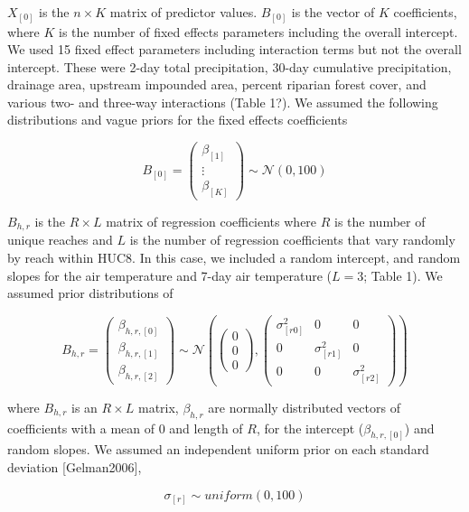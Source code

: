 \documentclass[]{article}
\begin{document}
\(X_{[0]}\) is the \(n \times K\) matrix of predictor values.
\(B_{[0]}\) is the vector of \(K\) coefficients, where \(K\) is the
number of fixed effects parameters including the overall intercept. We
used 15 fixed effect parameters including interaction terms but not the
overall intercept. These were 2-day total precipitation, 30-day
cumulative precipitation, drainage area, upstream impounded area,
percent riparian forest cover, and various two- and three-way
interactions (Table 1?). We assumed the following distributions and
vague priors for the fixed effects coefficients

\[ 
B_{[0]} = \left( \begin{array}{c} \beta_{[1]} \\ \vdots \\ \beta_{[K]} \end{array} \right) \sim \mathcal{N}(0, 100) 
\]

\(B_{h,r}\) is the \(R \times L\) matrix of regression coefficients
where \(R\) is the number of unique reaches and \(L\) is the number of
regression coefficients that vary randomly by reach within HUC8. In this
case, we included a random intercept, and random slopes for the air
temperature and 7-day air temperature (\(L = 3\); Table 1). We assumed
prior distributions of

\[ 
B_{h,r} = \left( \begin{array}{c} \beta_{h,r,[0]} \\ \beta_{h,r,[1]} \\ \beta_{h,r,[2]} \end{array} \right) \sim \mathcal{N}\left(\left(\begin{array}{c} 0 \\ 0 \\ 0 \end{array} \right), \left( \begin{array}{ccc} \sigma_{[r0]}^2 & 0 & 0 \\ 0 & \sigma_{[r1]}^2 & 0 \\ 0 & 0 & \sigma_{[r2]}^2 \end{array} \right) \right)
\]

where \(B_{h,r}\) is an \(R \times L\) matrix, \(\beta_{h,r}\) are
normally distributed vectors of coefficients with a mean of 0 and length
of \(R\), for the intercept (\(\beta_{h,r,[0]}\)) and random slopes. We
assumed an independent uniform prior on each standard deviation
{[}Gelman2006{]},

\[ 
\sigma_{[r]} \sim uniform(0,100)
\]
\end{document}
